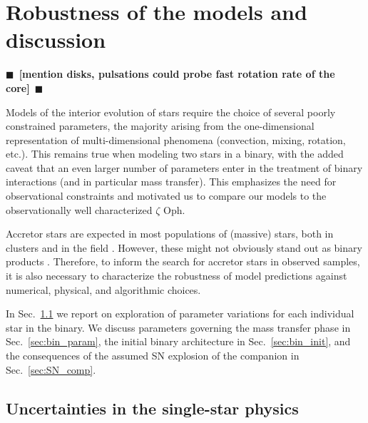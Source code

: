 \documentclass[twocolumn,twocolappendix,trackchanges]{aastex63}
\DeclareRobustCommand{\Secref}[1]{Sec.~\ref{#1}}
\newcommand{\zoph}{$\zeta$ Oph}
\newcommand{\todo}[1]{{\large $\blacksquare$~\textbf{\color{red}[#1]}}~$\blacksquare$}
\begin{document}
\section{Robustness of the models and discussion}
\label{sec:discussion}

\todo{mention disks, pulsations could probe fast rotation rate of the core}

Models of the interior evolution of stars require the choice of
several poorly constrained parameters, the majority arising from the
one-dimensional representation of multi-dimensional phenomena
(convection, mixing, rotation, etc.). This remains true when modeling
two stars in a binary, with the added caveat that an even larger
number of parameters enter in the treatment of binary interactions (and in
particular mass transfer). This emphasizes the need for
observational constraints and motivated us to compare our models to
the observationally well characterized \zoph.

Accretor stars are expected in most populations of (massive)
stars, both in clusters \citep[e.g.,][]{chen:09, wang:20} and in the field
\citep[e.g.,][]{demink:11, demink:13}. However, these might not obviously stand
out as binary products \citep[e.g.,][]{renzo:19walk}. Therefore, to
inform the search for accretor stars in observed samples, it is
also necessary to characterize the robustness of model predictions
against numerical, physical, and algorithmic choices.

In \Secref{sec:single_star_uncertainties}
we report on exploration of parameter variations for each individual
star in the binary. We discuss parameters governing the mass transfer phase in
\Secref{sec:bin_param}, the initial binary architecture in
\Secref{sec:bin_init}, and the consequences of the assumed SN
explosion of the companion in \Secref{sec:SN_comp}.


\subsection{Uncertainties in the single-star physics}
\label{sec:single_star_uncertainties}
\end{document}
